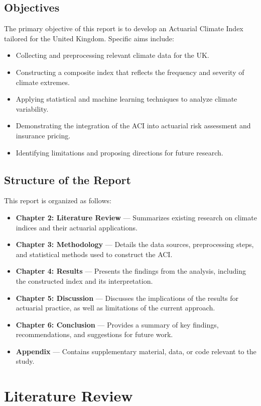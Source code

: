 \documentclass[12pt,a4paper]{report}
\begin{document}
\section{Objectives}
The primary objective of this report is to develop an Actuarial Climate Index tailored for the United Kingdom. Specific aims include:
\begin{itemize}
    \item Collecting and preprocessing relevant climate data for the UK.
    \item Constructing a composite index that reflects the frequency and severity of climate extremes.
    \item Applying statistical and machine learning techniques to analyze climate variability.
    \item Demonstrating the integration of the ACI into actuarial risk assessment and insurance pricing.
    \item Identifying limitations and proposing directions for future research.
\end{itemize}

\section{Structure of the Report}
This report is organized as follows:
\begin{itemize}
    \item \textbf{Chapter 2: Literature Review} --- Summarizes existing research on climate indices and their actuarial applications.
    \item \textbf{Chapter 3: Methodology} --- Details the data sources, preprocessing steps, and statistical methods used to construct the ACI.
    \item \textbf{Chapter 4: Results} --- Presents the findings from the analysis, including the constructed index and its interpretation.
    \item \textbf{Chapter 5: Discussion} --- Discusses the implications of the results for actuarial practice, as well as limitations of the current approach.
    \item \textbf{Chapter 6: Conclusion} --- Provides a summary of key findings, recommendations, and suggestions for future work.
    \item \textbf{Appendix} --- Contains supplementary material, data, or code relevant to the study.
\end{itemize}

\chapter{Literature Review}
\end{document}
